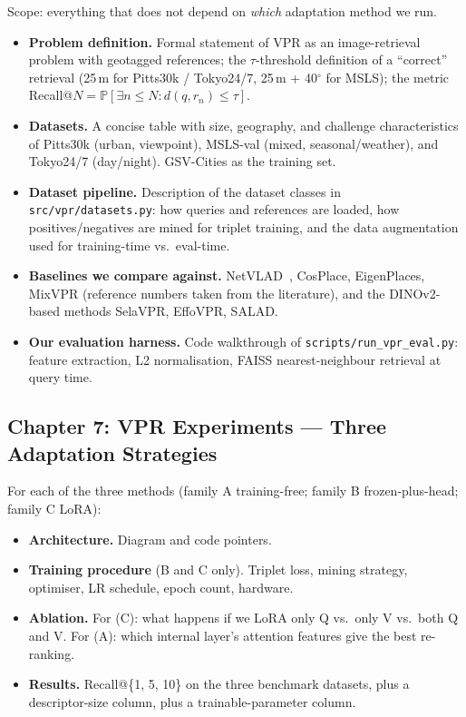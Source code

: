 \documentclass[11pt,a4paper]{article}
\begin{document}
Scope: everything that does not depend on \emph{which} adaptation method
we run.

\begin{itemize}[leftmargin=*]
  \item \textbf{Problem definition.} Formal statement of VPR as an
  image-retrieval problem with geotagged references; the
  $\tau$-threshold definition of a ``correct'' retrieval (25\,m for
  Pitts30k / Tokyo24/7, 25\,m + 40$^\circ$ for MSLS); the metric
  Recall@$N = \mathbb{P}[\exists n \leq N: d(q, r_n) \leq \tau]$.
  \item \textbf{Datasets.} A concise table with size, geography, and
  challenge characteristics of Pitts30k (urban, viewpoint), MSLS-val
  (mixed, seasonal/weather), and Tokyo24/7 (day/night). GSV-Cities as
  the training set.
  \item \textbf{Dataset pipeline.} Description of the dataset classes
  in \texttt{src/vpr/datasets.py}: how queries and references are
  loaded, how positives/negatives are mined for triplet training, and
  the data augmentation used for training-time vs.\ eval-time.
  \item \textbf{Baselines we compare against.} NetVLAD~\citep{arandjelovic2016netvlad},
  CosPlace, EigenPlaces, MixVPR (reference numbers taken from the
  literature), and the DINOv2-based methods SelaVPR, EffoVPR, SALAD.
  \item \textbf{Our evaluation harness.} Code walkthrough of
  \texttt{scripts/run\_vpr\_eval.py}: feature extraction, L2
  normalisation, FAISS nearest-neighbour retrieval at query time.
\end{itemize}

\subsection*{Chapter 7: VPR Experiments --- Three Adaptation Strategies}
\label{ch:vpr-experiments}

For each of the three methods (family A training-free; family B
frozen-plus-head; family C LoRA):

\begin{itemize}[leftmargin=*]
  \item \textbf{Architecture.} Diagram and code pointers.
  \item \textbf{Training procedure} (B and C only). Triplet loss,
  mining strategy, optimiser, LR schedule, epoch count, hardware.
  \item \textbf{Ablation.} For (C): what happens if we LoRA only Q
  vs.\ only V vs.\ both Q and V. For (A): which internal layer's
  attention features give the best re-ranking.
  \item \textbf{Results.} Recall@\{1, 5, 10\} on the three benchmark
  datasets, plus a descriptor-size column, plus a trainable-parameter
  column.
\end{itemize}
\end{document}
